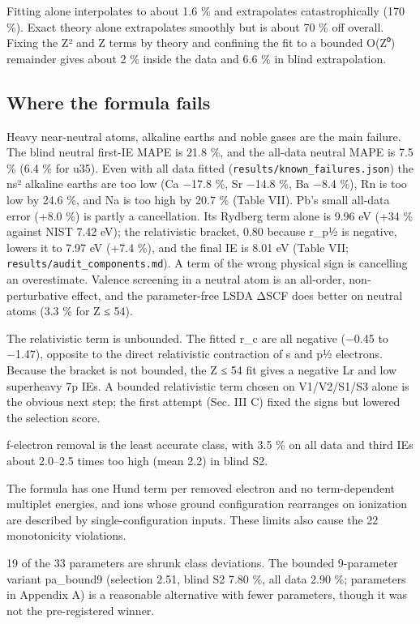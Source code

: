 \documentclass[aps,pra,preprint,superscriptaddress,amsmath,amssymb]{revtex4-2}
\begin{document}
Fitting alone interpolates to about 1.6 \% and extrapolates catastrophically (170 \%). Exact theory alone extrapolates smoothly but is about 70 \% off overall. Fixing the Z² and Z terms by theory and confining the fit to a bounded O(Z⁰) remainder gives about 2 \% inside the data and 6.6 \% in blind extrapolation.


\subsection{Where the formula fails}

Heavy near-neutral atoms, alkaline earths and noble gases are the main failure. The blind neutral first-IE MAPE is 21.8 \%, and the all-data neutral MAPE is 7.5 \% (6.4 \% for u35). Even with all data fitted (\texttt{results/known\_failures.json}) the ns² alkaline earths are too low (Ca −17.8 \%, Sr −14.8 \%, Ba −8.4 \%), Rn is too low by 24.6 \%, and Na is too high by 20.7 \% (Table VII). Pb's small all-data error (+8.0 \%) is partly a cancellation. Its Rydberg term alone is 9.96 eV (+34 \% against NIST 7.42 eV); the relativistic bracket, 0.80 because r\_p½ is negative, lowers it to 7.97 eV (+7.4 \%), and the final IE is 8.01 eV (Table VII; \texttt{results/audit\_components.md}). A term of the wrong physical sign is cancelling an overestimate. Valence screening in a neutral atom is an all-order, non-perturbative effect, and the parameter-free LSDA ΔSCF does better on neutral atoms (3.3 \% for Z ≤ 54).


The relativistic term is unbounded. The fitted r\_c are all negative (−0.45 to −1.47), opposite to the direct relativistic contraction of s and p½ electrons. Because the bracket is not bounded, the Z ≤ 54 fit gives a negative Lr and low superheavy 7p IEs. A bounded relativistic term chosen on V1/V2/S1/S3 alone is the obvious next step; the first attempt (Sec. III C) fixed the signs but lowered the selection score.


f-electron removal is the least accurate class, with 3.5 \% on all data and third IEs about 2.0–2.5 times too high (mean 2.2) in blind S2.


The formula has one Hund term per removed electron and no term-dependent multiplet energies, and ions whose ground configuration rearranges on ionization are described by single-configuration inputs. These limits also cause the 22 monotonicity violations.


19 of the 33 parameters are shrunk class deviations. The bounded 9-parameter variant pa\_bound9 (selection 2.51, blind S2 7.80 \%, all data 2.90 \%; parameters in Appendix A) is a reasonable alternative with fewer parameters, though it was not the pre-registered winner.
\end{document}
